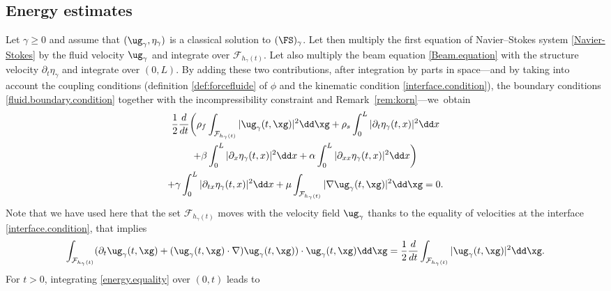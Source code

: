 \subsection{Energy estimates}
Let $\gamma \geq 0 $ and assume that $(\ug_\gamma, \eta_\gamma)$ is a classical solution to $(\FS)_{\gamma}$. Let then multiply the first equation of Navier--Stokes system \eqref{Navier-Stokes} by the fluid velocity $\ug_\gamma$ and integrate over $\mathcal{F}_{h_\gamma(t)}$. Let also multiply the beam equation \eqref{Beam.equation} with the structure velocity $\partial_t\eta_{\gamma}$ and integrate over $(0, L)$. By adding these two contributions, after integration by parts in space---and by taking into account the coupling conditions (definition \eqref{def:forcefluide} of $\phi$ and the kinematic condition \eqref{interface.condition}), the boundary conditions \eqref{fluid.boundary.condition} together with the incompressibility constraint and Remark~\ref{rem:korn}---we~obtain
\begin{multline}\label{energy.equality}
\frac{1}{2}\frac{d}{dt}\biggl(\rho_{f}\int_{\mathcal{F}_{h_{\gamma}(t)}}\vert\ug_{\gamma}(t, \xg) \vert^{2} \dd\xg+ \rho_{s}\int_{0}^{L}\vert\partial_{t}\eta_{\gamma}(t, x) \vert^{2}\dd x \\
 +\beta\int_{0}^{L}\vert\partial_{x}\eta_{\gamma}(t, x) \vert^{2}\dd x+\alpha\int_{0}^{L}\vert\partial_{xx}\eta_{\gamma}(t, x)\vert^{2} \dd x\biggr)\\
 +\gamma\int_{0}^{L}\vert\partial_{tx}\eta_{\gamma}(t, x)\vert^{2} \dd x+ \mu\int_{\mathcal{F}_{h_{\gamma}(t)}}\vert \nabla\ug_{\gamma}(t, \xg) \vert^{2}\dd \xg=0.
\end{multline}
Note that we have used here that the set ${\mathcal{F}_{h_{\gamma}(t)}}$ moves with the velocity field $\ug_{\gamma}$ thanks to the equality of velocities at the interface \eqref{interface.condition}, that implies
\[
\int_{\mathcal{F}_{h_{\gamma}(t)}}(\partial_t\ug_\gamma(t, \xg)+(\ug_{\gamma}(t, \xg)\cdot\nabla )\ug_{\gamma}(t, \xg))\cdot \ug_{\gamma}(t, \xg)\dd\xg = \frac{1}{2}\frac{d}{dt}\int_{\mathcal{F}_{h_{\gamma}(t)}}\vert\ug_{\gamma}(t, \xg) \vert^{2} \dd\xg.
\]
For $t >0$, integrating \eqref{energy.equality} over $(0, t)$ leads to
